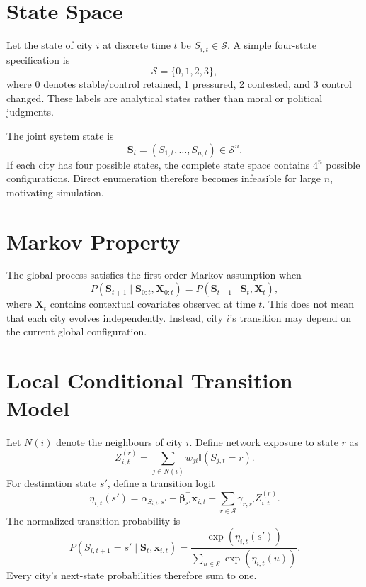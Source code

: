 \documentclass[11pt,letterpaper]{article}
\begin{document}
\section{State Space}
Let the state of city $i$ at discrete time $t$ be $S_{i,t}\in\mathcal{S}$. A simple four-state specification is
\begin{equation}
\mathcal{S}=\{0,1,2,3\},
\end{equation}
where 0 denotes stable/control retained, 1 pressured, 2 contested, and 3 control changed. These labels are analytical states rather than moral or political judgments.

The joint system state is
\begin{equation}
\mathbf{S}_t=(S_{1,t},\ldots,S_{n,t})\in\mathcal{S}^n.
\end{equation}
If each city has four possible states, the complete state space contains $4^n$ possible configurations. Direct enumeration therefore becomes infeasible for large $n$, motivating simulation.

\section{Markov Property}
The global process satisfies the first-order Markov assumption when
\begin{equation}
P(\mathbf{S}_{t+1}\mid\mathbf{S}_{0:t},\mathbf{X}_{0:t})
=
P(\mathbf{S}_{t+1}\mid\mathbf{S}_{t},\mathbf{X}_{t}),
\label{eq:markov}
\end{equation}
where $\mathbf{X}_t$ contains contextual covariates observed at time $t$. This does not mean that each city evolves independently. Instead, city $i$'s transition may depend on the current global configuration.

\section{Local Conditional Transition Model}
Let $N(i)$ denote the neighbours of city $i$. Define network exposure to state $r$ as
\begin{equation}
Z_{i,t}^{(r)}=\sum_{j\in N(i)}w_{ji}\mathbb{I}(S_{j,t}=r).
\end{equation}
For destination state $s'$, define a transition logit
\begin{equation}
\eta_{i,t}(s')=\alpha_{S_{i,t},s'}+\boldsymbol{\beta}_{s'}^{\top}\mathbf{x}_{i,t}+\sum_{r\in\mathcal{S}}\gamma_{r,s'}Z_{i,t}^{(r)}.
\end{equation}
The normalized transition probability is
\begin{equation}
P(S_{i,t+1}=s'\mid\mathbf{S}_t,\mathbf{x}_{i,t})
=
\frac{\exp(\eta_{i,t}(s'))}{\sum_{u\in\mathcal{S}}\exp(\eta_{i,t}(u))}.
\label{eq:softmax}
\end{equation}
Every city's next-state probabilities therefore sum to one.
\end{document}
